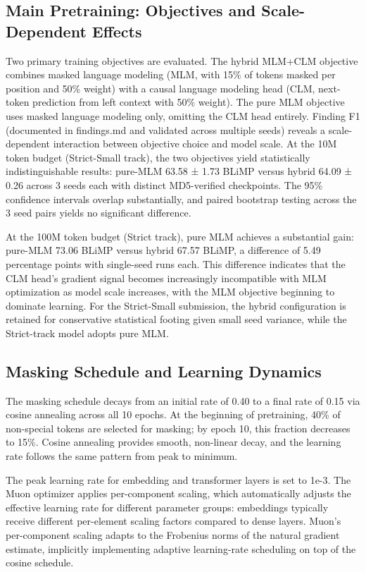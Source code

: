 \subsection{Main Pretraining: Objectives and Scale-Dependent Effects}

Two primary training objectives are evaluated. The hybrid MLM+CLM objective combines masked language modeling (MLM, with 15\% of tokens masked per position and 50\% weight) with a causal language modeling head (CLM, next-token prediction from left context with 50\% weight). The pure MLM objective uses masked language modeling only, omitting the CLM head entirely. Finding F1 (documented in findings.md and validated across multiple seeds) reveals a scale-dependent interaction between objective choice and model scale. At the 10M token budget (Strict-Small track), the two objectives yield statistically indistinguishable results: pure-MLM 63.58 ± 1.73 BLiMP versus hybrid 64.09 ± 0.26 across 3 seeds each with distinct MD5-verified checkpoints. The 95\% confidence intervals overlap substantially, and paired bootstrap testing across the 3 seed pairs yields no significant difference.

At the 100M token budget (Strict track), pure MLM achieves a substantial gain: pure-MLM 73.06 BLiMP versus hybrid 67.57 BLiMP, a difference of 5.49 percentage points with single-seed runs each. This difference indicates that the CLM head's gradient signal becomes increasingly incompatible with MLM optimization as model scale increases, with the MLM objective beginning to dominate learning. For the Strict-Small submission, the hybrid configuration is retained for conservative statistical footing given small seed variance, while the Strict-track model adopts pure MLM.

\subsection{Masking Schedule and Learning Dynamics}

The masking schedule decays from an initial rate of 0.40 to a final rate of 0.15 via cosine annealing across all 10 epochs. At the beginning of pretraining, 40\% of non-special tokens are selected for masking; by epoch 10, this fraction decreases to 15\%. Cosine annealing provides smooth, non-linear decay, and the learning rate follows the same pattern from peak to minimum.

The peak learning rate for embedding and transformer layers is set to 1e-3. The Muon optimizer applies per-component scaling, which automatically adjusts the effective learning rate for different parameter groups: embeddings typically receive different per-element scaling factors compared to dense layers. Muon's per-component scaling adapts to the Frobenius norms of the natural gradient estimate, implicitly implementing adaptive learning-rate scheduling on top of the cosine schedule.

